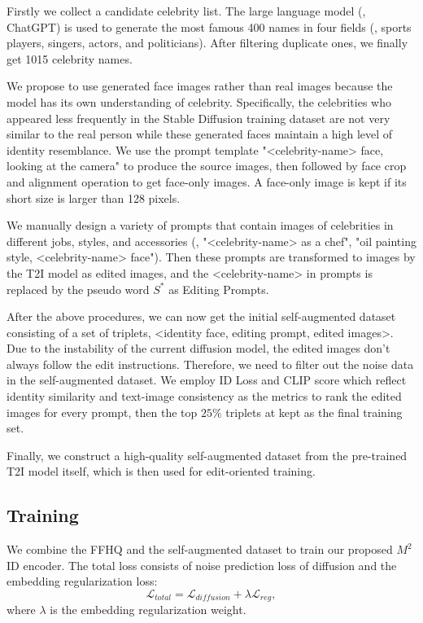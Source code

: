  Firstly we collect a candidate celebrity list. The large language model (\ie, ChatGPT) is used to generate the most famous 400 names in four fields (\ie, sports players, singers, actors, and politicians). After filtering duplicate ones, we finally get 1015 celebrity names.

 We propose to use generated face images rather than real images because the model has its own understanding of celebrity. Specifically, the celebrities who appeared less frequently in the Stable Diffusion training dataset are not very similar to the real person while these generated faces maintain a high level of identity resemblance. We use the prompt template "<celebrity-name> face, looking at the camera" to produce the source images, then followed by face crop and alignment operation to get face-only images. A face-only image is kept if its short size is larger than 128 pixels. 

 We manually design a variety of prompts that contain images of celebrities in different jobs, styles, and accessories (\eg, "<celebrity-name> as a chef", "oil painting style, <celebrity-name> face"). Then these prompts are transformed to images by the T2I model as edited images, and the <celebrity-name> in prompts is replaced by the pseudo word $S^*$ as Editing Prompts.

 After the above procedures, we can now get the initial self-augmented dataset consisting of a set of triplets, <identity face, editing prompt, edited images>. Due to the instability of the current diffusion model, the edited images don't always follow the edit instructions. 
Therefore, we need to filter out the noise data in the self-augmented dataset. We employ ID Loss and CLIP score which reflect identity similarity and text-image consistency as the metrics to rank the edited images for every prompt, then the top $25\%$ triplets at kept as the final training set. 

Finally, we construct a high-quality self-augmented dataset from the pre-trained T2I model itself, which is then used for edit-oriented training.


\subsection{Training}
We combine the FFHQ \cite{karras2019style} and the self-augmented dataset to train our proposed $M^2$ ID encoder. The total loss consists of noise prediction loss of diffusion and the embedding regularization loss:  
\begin{equation}
\mathcal{L}_{total} = \mathcal{L}_{diffusion} + \lambda \mathcal{L}_{reg} ,
\end{equation} 
where $\lambda$ is the embedding regularization weight.


